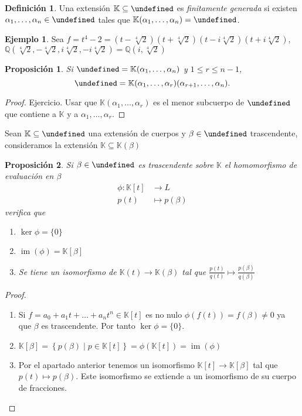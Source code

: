 \documentclass[10pt, spanish]{report}
\newtheorem*{prop}{Proposición}
\theoremstyle{definition}
\newtheorem*{defin}{Definición}
\newtheorem*{ej}{Ejemplo}
\newcommand{\Q}{\mathbb{Q}}
\newcommand{\K}{\mathbb{K}}
\let\L\undefined
\newcommand{\L}{\mathbb{L}}
\newcommand{\im}[1]{\operatorname{im}\left(#1\right)}
\renewcommand{\leq}{\leqslant}
\begin{document}
\begin{defin}
    Una extensión $\K\subseteq\L$ es \textit{finitamente generada} si existen
    $\alpha_1,\ldots,\alpha_n\in\L$ tales que $\K(\alpha_1,\ldots,\alpha_n)=\L$.
\end{defin}

\begin{ej}
    Sea
    $f=t^4-2=(t-\sqrt[4]{2})(t+\sqrt[4]{2})(t-i\sqrt[4]{2})(t+i\sqrt[4]{2})$,
    $\Q(\sqrt[4]{2},-\sqrt[4]{2},i\sqrt[4]{2},-i\sqrt[4]{2})=\Q(i,\sqrt[4]{2})$
\end{ej}

\begin{prop}
Si $\L=\K(\alpha_1,\ldots,\alpha_n)$ y $1\leq r\leq n-1$,
\[\L=\K(\alpha_1,\ldots,\alpha_r)(\alpha_{r+1},\ldots,\alpha_n).\]
\end{prop}

\begin{proof}
    Ejercicio. Usar que $\K(\alpha_1,\ldots,\alpha_r)$ es el menor subcuerpo de
    $\L$ que contiene a $\K$ y a $\alpha_1,\ldots,\alpha_r$.
\end{proof}

Sean $\K\subseteq\L$ una extensión de cuerpos y $\beta\in\L$ trascendente, 
consideramos la extensión $\K\subseteq\K(\beta)$

\begin{prop}
    Si $\beta\in\L$ es trascendente sobre $\K$ el homomorfismo de evaluación en
    $\beta$
    \begin{align*}
        \phi:\K[t]&\to L \\
    p(t)&\mapsto p(\beta)
    \end{align*}
    verifica que
    \begin{enumerate}
        \item $\ker{\phi}=\{0\}$
        \item $\im{\phi}=\K[\beta]$
        \item Se tiene un isomorfismo de $\K(t)\to \K(\beta)$ tal que
            $\frac{p(t)}{q(t)}\mapsto \frac{p(\beta)}{q(\beta)}$
    \end{enumerate}
\end{prop}

\begin{proof}\hspace{0pt}
    \begin{enumerate}
        \item Si $f=a_0+a_1t+\ldots+a_nt^n\in\K[t]$ es no nulo
            $\phi(f(t))=f(\beta)\neq0$ ya que $\beta$ es trascendente. Por tanto
            $\ker{\phi}=\{0\}$.
        \item $\K[\beta]=\left\{ p(\beta)\mid
            p\in\K[t]\right\}=\phi(\K[t])=\im{\phi}$
        \item Por el apartado anterior tenemos un isomorfismo
            $\K[t]\to \K[\beta]$  tal que $p(t)\mapsto p(\beta)$. Este
            isomorfismo se extiende a un isomorfismo de su cuerpo de fracciones.
    \end{enumerate}
\end{proof}
\end{document}
